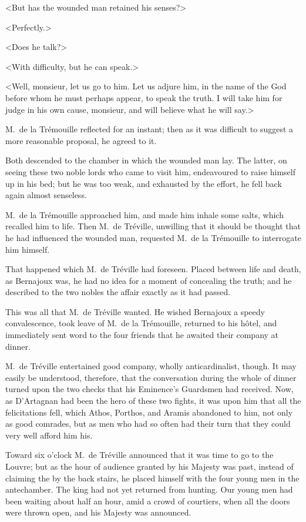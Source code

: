 <But has the wounded man retained his senses?> 

<Perfectly.> 

<Does he talk?> 

<With difficulty, but he can speak.> 

<Well, monsieur, let us go to him. Let us adjure him, in the name of the God before whom he must perhaps appear, to speak the truth. I will take him for judge in his own cause, monsieur, and will believe what he will say.> 

M.~de la Trémouille reflected for an instant; then as it was difficult to suggest a more reasonable proposal, he agreed to it. 

Both descended to the chamber in which the wounded man lay. The latter, on seeing these two noble lords who came to visit him, endeavoured to raise himself up in his bed; but he was too weak, and exhausted by the effort, he fell back again almost senseless. 

M.~de la Trémouille approached him, and made him inhale some salts, which recalled him to life. Then M.~de Tréville, unwilling that it should be thought that he had influenced the wounded man, requested M.~de la Trémouille to interrogate him himself. 

That happened which M.~de Tréville had foreseen. Placed between life and death, as Bernajoux was, he had no idea for a moment of concealing the truth; and he described to the two nobles the affair exactly as it had passed. 

This was all that M.~de Tréville wanted. He wished Bernajoux a speedy convalescence, took leave of M.~de la Trémouille, returned to his hôtel, and immediately sent word to the four friends that he awaited their company at dinner. 

M.~de Tréville entertained good company, wholly anticardinalist, though. It may easily be understood, therefore, that the conversation during the whole of dinner turned upon the two checks that his Eminence's Guardsmen had received. Now, as D'Artagnan had been the hero of these two fights, it was upon him that all the felicitations fell, which Athos, Porthos, and Aramis abandoned to him, not only as good comrades, but as men who had so often had their turn that they could very well afford him his. 

Toward six o'clock M.~de Tréville announced that it was time to go to the Louvre; but as the hour of audience granted by his Majesty was past, instead of claiming the  by the back stairs, he placed himself with the four young men in the antechamber. The king had not yet returned from hunting. Our young men had been waiting about half an hour, amid a crowd of courtiers, when all the doors were thrown open, and his Majesty was announced. 

